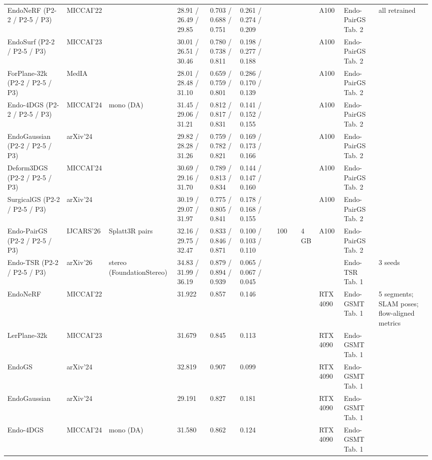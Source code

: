 \documentclass[9pt]{extarticle}
\begin{document}
\begin{longtable}{@{}p{4.2cm}p{1.15cm}p{2.1cm}p{2.2cm}p{2.0cm}p{2.0cm}p{1.35cm}p{0.85cm}p{1.15cm}p{1.0cm}p{1.35cm}p{2.3cm}p{3.6cm}@{}}
EndoNeRF (P2-2 / P2-5 / P3) & MICCAI'22 &  & 28.91 / 26.49 / 29.85 & 0.703 / 0.688 / 0.751 & 0.261 / 0.274 / 0.209 &  &  &  &  & A100 & Endo-PairGS Tab. 2 & all retrained \\
EndoSurf (P2-2 / P2-5 / P3) & MICCAI'23 &  & 30.01 / 26.51 / 30.46 & 0.780 / 0.738 / 0.811 & 0.198 / 0.277 / 0.188 &  &  &  &  & A100 & Endo-PairGS Tab. 2 &  \\
ForPlane-32k (P2-2 / P2-5 / P3) & MedIA &  & 28.01 / 28.48 / 31.10 & 0.659 / 0.759 / 0.801 & 0.286 / 0.170 / 0.139 &  &  &  &  & A100 & Endo-PairGS Tab. 2 &  \\
Endo-4DGS (P2-2 / P2-5 / P3) & MICCAI'24 & mono (DA) & 31.45 / 29.06 / 31.21 & 0.812 / 0.817 / 0.831 & 0.141 / 0.152 / 0.155 &  &  &  &  & A100 & Endo-PairGS Tab. 2 &  \\
EndoGaussian (P2-2 / P2-5 / P3) & arXiv'24 &  & 29.82 / 28.28 / 31.26 & 0.759 / 0.782 / 0.821 & 0.169 / 0.173 / 0.166 &  &  &  &  & A100 & Endo-PairGS Tab. 2 &  \\
Deform3DGS (P2-2 / P2-5 / P3) & MICCAI'24 &  & 30.69 / 29.16 / 31.70 & 0.789 / 0.813 / 0.834 & 0.144 / 0.147 / 0.160 &  &  &  &  & A100 & Endo-PairGS Tab. 2 &  \\
SurgicalGS (P2-2 / P2-5 / P3) & arXiv'24 &  & 30.19 / 29.07 / 31.97 & 0.775 / 0.805 / 0.841 & 0.178 / 0.168 / 0.155 &  &  &  &  & A100 & Endo-PairGS Tab. 2 &  \\
Endo-PairGS (P2-2 / P2-5 / P3) & IJCARS'26 & Splatt3R pairs & 32.16 / 29.75 / 32.47 & 0.833 / 0.846 / 0.871 & 0.100 / 0.103 / 0.110 &  & 100 &  & 4 GB & A100 & Endo-PairGS Tab. 2 &  \\
Endo-TSR (P2-2 / P2-5 / P3) & arXiv'26 & stereo (FoundationStereo) & 34.83 / 31.99 / 36.19 & 0.879 / 0.894 / 0.939 & 0.065 / 0.067 / 0.045 &  &  &  &  &  & Endo-TSR Tab. 1 & 3 seeds \\
EndoNeRF & MICCAI'22 &  & 31.922 & 0.857 & 0.146 &  &  &  &  & RTX 4090 & Endo-GSMT Tab. 1 & 5 segments; SLAM poses; flow-aligned metrics \\
LerPlane-32k & MICCAI'23 &  & 31.679 & 0.845 & 0.113 &  &  &  &  & RTX 4090 & Endo-GSMT Tab. 1 &  \\
EndoGS & arXiv'24 &  & 32.819 & 0.907 & 0.099 &  &  &  &  & RTX 4090 & Endo-GSMT Tab. 1 &  \\
EndoGaussian & arXiv'24 &  & 29.191 & 0.827 & 0.181 &  &  &  &  & RTX 4090 & Endo-GSMT Tab. 1 &  \\
Endo-4DGS & MICCAI'24 & mono (DA) & 31.580 & 0.862 & 0.124 &  &  &  &  & RTX 4090 & Endo-GSMT Tab. 1 &  \\

\end{longtable}
\end{document}
